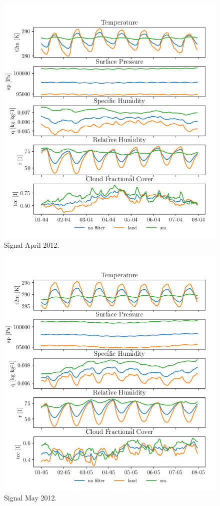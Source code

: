 \begin{figure}[ht]
    \centering
    \includegraphics{python_figs/spatially_averaged_one_week_from_2012-04-01.png}
    \caption{Signal April 2012.}
    \label{fig:april12}
\end{figure}



\begin{figure}[ht]
    \centering
    \includegraphics{python_figs/spatially_averaged_one_week_from_2012-05-01.png}
    \caption{Signal May 2012.}
    \label{fig:may12}
\end{figure}


